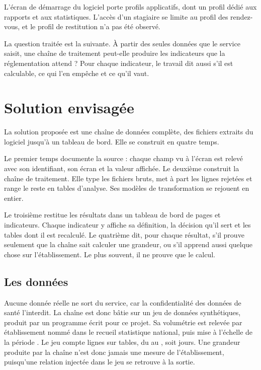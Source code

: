L'écran de démarrage du logiciel porte  profils applicatifs, dont un
profil dédié aux rapports et aux statistiques. L'accès d'un stagiaire se limite
au profil des rendez-vous, et le profil de restitution n'a pas été observé.

La question traitée est la suivante. À partir des seules données que le service saisit, une chaîne
de traitement peut-elle produire les indicateurs que la réglementation attend ? Pour chaque
indicateur, le travail dit aussi s'il est calculable, ce qui l'en empêche et ce qu'il vaut.

\section*{Solution envisagée}

La solution proposée est une chaîne de données complète, des fichiers extraits du logiciel jusqu'à
un tableau de bord. Elle se construit en quatre temps.

Le premier temps documente la source : chaque champ vu à l'écran est relevé avec son identifiant,
son écran et la valeur affichée. Le deuxième construit la chaîne de traitement. Elle type les
fichiers bruts, met à part les lignes rejetées et range le reste en tables d'analyse. Ses
 modèles de transformation se rejouent en entier.

Le troisième restitue les résultats dans un tableau de bord de  pages et
 indicateurs. Chaque indicateur y affiche sa définition, la décision qu'il
sert et les tables dont il est recalculé. Le quatrième dit, pour chaque résultat, s'il prouve
seulement que la chaîne sait calculer une grandeur, ou s'il apprend aussi quelque chose sur
l'établissement. Le plus souvent, il ne prouve que le calcul.

\subsection*{Les données}

Aucune donnée réelle ne sort du service, car la confidentialité des données de santé l'interdit. La
chaîne est donc bâtie sur un jeu de données synthétiques, produit par un programme écrit pour ce
projet. Sa volumétrie est relevée par établissement nommé dans le recueil statistique national, puis
mise à l'échelle de la période \cite{s30}. Le jeu compte  lignes sur
 tables, du  au , soit
 jours. Une grandeur produite par la chaîne n'est donc jamais une mesure de
l'établissement, puisqu'une relation injectée dans le jeu se retrouve à la sortie.

